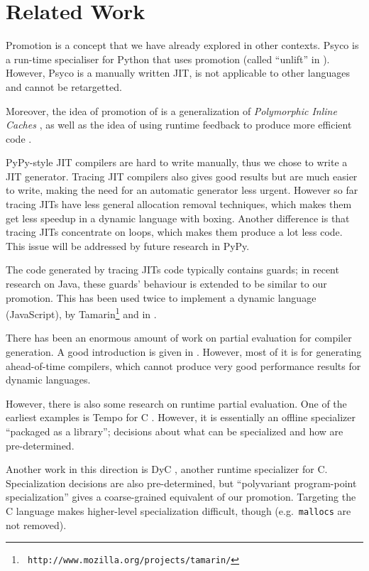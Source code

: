 \section{Related Work}

Promotion is a concept that we have already explored in other contexts. Psyco is
a run-time specialiser for Python that uses promotion (called ``unlift'' in
\cite{DBLP:conf/pepm/Rigo04}). However, Psyco is a manually written JIT, is
not applicable to other languages and cannot be retargetted.

Moreover, the idea of promotion of is a generalization of \emph{Polymorphic
  Inline Caches} \cite{hoelzle_optimizing_1991}, as well as the idea of using
runtime feedback to produce more efficient code
\cite{hoelzle_type_feedback_1994}.

PyPy-style JIT compilers are hard to write manually, thus we chose to write a
JIT generator.  Tracing JIT compilers \cite{gal_hotpathvm_2006} also gives
good results but are much easier to write, making the need for an automatic
generator less urgent.  However so far tracing JITs have less general
allocation removal techniques, which makes them get less speedup in a dynamic
language with boxing.  Another difference is that tracing JITs concentrate on
loops, which makes them produce a lot less code.  This issue will be addressed
by future research in PyPy.

The code generated by tracing JITs code typically contains guards; in recent research
\cite{gal_incremental_2006} on Java, these guards' behaviour is extended to be
similar to our promotion.  This has been used twice to implement a dynamic
language (JavaScript), by Tamarin\footnote{{\tt
http://www.mozilla.org/projects/tamarin/}} and in \cite{chang_efficient_2007}.

There has been an enormous amount of work on partial evaluation for compiler
generation. A good introduction is given in \cite{Jones:peval}. However, most of
it is for generating ahead-of-time compilers, which cannot produce very good
performance results for dynamic languages.

However, there is also some research on runtime partial evaluation. One of the
earliest examples is Tempo for C
\cite{DBLP:conf/popl/ConselN96,DBLP:conf/dagstuhl/ConselHNNV96}. However, it is
essentially an offline specializer ``packaged as a library''; decisions about
what can be specialized and how are pre-determined.

Another work in this direction is DyC \cite{grant_dyc_2000}, another runtime
specializer for C.  Specialization decisions are also pre-determined, but
``polyvariant program-point specialization'' gives a coarse-grained equivalent
of our promotion.  Targeting the C language makes higher-level specialization
difficult, though (e.g.\ \texttt{mallocs} are not removed).

